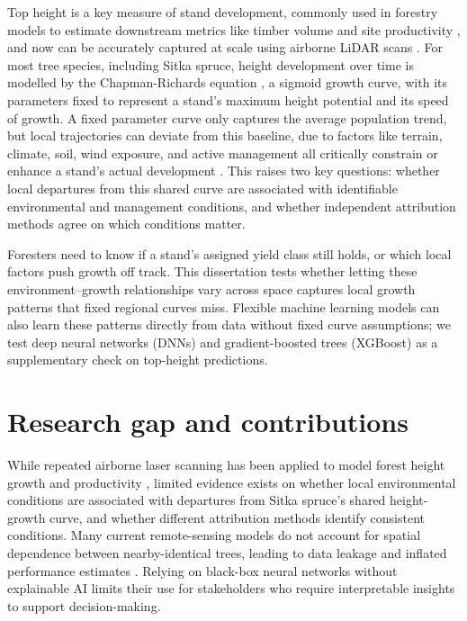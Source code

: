 \documentclass[logo,msc,ai]{infthesis}           %
\begin{document}
Top height is a key measure of stand development, commonly used in forestry models to estimate downstream metrics like timber volume and site productivity \cite{ForestResearch2026Sitka_C1_SS}, and now can be accurately captured at scale using airborne LiDAR scans \cite{suarezminguez2008Practical_C1_SS}. For most tree species, including Sitka spruce, height development over time is modelled by the Chapman-Richards equation \cite{pommerening2015Methods_C2_CR}, a sigmoid growth curve, with its parameters fixed to represent a stand's maximum height potential and its speed of growth. A fixed parameter curve only captures the average population trend, but local trajectories can deviate from this baseline, due to factors like terrain, climate, soil, wind exposure, and active management all critically constrain or enhance a stand's actual development \cite{socha2023Higher_C1_SS, cameron2015Building_C1_SS}.  This raises two key questions: whether local departures from this shared curve are associated with identifiable environmental and management conditions, and whether independent attribution methods agree on which conditions matter.

Foresters need to know if a stand's assigned yield class still holds, or which local factors push growth off track. This dissertation tests whether letting these environment--growth relationships vary across space captures local growth patterns that fixed regional curves miss. Flexible machine learning models can also learn these patterns directly from data without fixed curve assumptions; we test deep neural networks (DNNs) and gradient-boosted trees (XGBoost) as a supplementary check on top-height predictions.

\section{Research gap and contributions}
While repeated airborne laser scanning has been applied to model forest height growth and productivity \cite{janiec2023Development_C1_SS}, limited evidence exists on whether local environmental conditions are associated with departures from Sitka spruce's shared height-growth curve, and whether different attribution methods identify consistent conditions. Many current remote-sensing models do not account for spatial dependence between nearby-identical trees, leading to data leakage and inflated performance estimates \cite{Karasiak2022Spatial_C5_EVAL, ploton2020Spatial_C5_EVAL, lynch2025Digital_C4_NN}. Relying on black-box neural networks without explainable AI limits their use for stakeholders who require interpretable insights to support decision-making.
\end{document}
